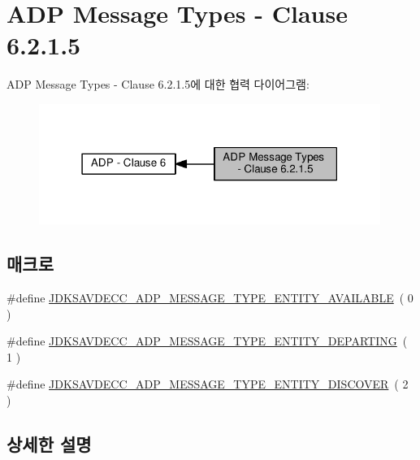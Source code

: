\hypertarget{group__adpdu__msg}{}\section{A\+DP Message Types -\/ Clause 6.2.1.5}
\label{group__adpdu__msg}
A\+DP Message Types -\/ Clause 6.2.1.5에 대한 협력 다이어그램\+:
\nopagebreak
\begin{figure}[H]
\begin{center}
\leavevmode
\includegraphics[width=315pt]{group__adpdu__msg}
\end{center}
\end{figure}
\subsection*{매크로}
\begin{DoxyCompactItemize}
\item 
\#define \hyperlink{group__adpdu__msg_ga6ff00b08fd0d337ed3639850bf352c0f}{J\+D\+K\+S\+A\+V\+D\+E\+C\+C\+\_\+\+A\+D\+P\+\_\+\+M\+E\+S\+S\+A\+G\+E\+\_\+\+T\+Y\+P\+E\+\_\+\+E\+N\+T\+I\+T\+Y\+\_\+\+A\+V\+A\+I\+L\+A\+B\+LE}~( 0 )
\item 
\#define \hyperlink{group__adpdu__msg_ga2c307c257b44926f0299f86c1b2dc94b}{J\+D\+K\+S\+A\+V\+D\+E\+C\+C\+\_\+\+A\+D\+P\+\_\+\+M\+E\+S\+S\+A\+G\+E\+\_\+\+T\+Y\+P\+E\+\_\+\+E\+N\+T\+I\+T\+Y\+\_\+\+D\+E\+P\+A\+R\+T\+I\+NG}~( 1 )
\item 
\#define \hyperlink{group__adpdu__msg_ga71372df276c0ad5c2b62ba9cd8bcacbd}{J\+D\+K\+S\+A\+V\+D\+E\+C\+C\+\_\+\+A\+D\+P\+\_\+\+M\+E\+S\+S\+A\+G\+E\+\_\+\+T\+Y\+P\+E\+\_\+\+E\+N\+T\+I\+T\+Y\+\_\+\+D\+I\+S\+C\+O\+V\+ER}~( 2 )
\end{DoxyCompactItemize}


\subsection{상세한 설명}


